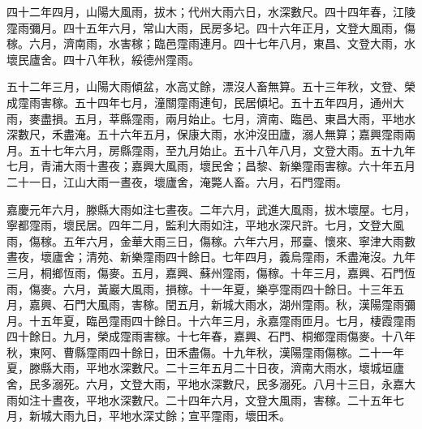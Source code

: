 \begin{pinyinscope}
四十二年四月，山陽大風雨，拔木；代州大雨六日，水深數尺。四十四年春，江陵霪雨彌月。四十五年六月，常山大雨，民房多圮。四十六年正月，文登大風雨，傷稼。六月，濟南雨，水害稼；臨邑霪雨連月。四十七年八月，東昌、文登大雨，水壞民廬舍。四十八年秋，綏德州霪雨。

五十二年三月，山陽大雨傾盆，水高丈餘，漂沒人畜無算。五十三年秋，文登、榮成霪雨害稼。五十四年七月，潼關霪雨連旬，民居傾圮。五十五年四月，通州大雨，麥盡損。五月，莘縣霪雨，兩月始止。七月，濟南、臨邑、東昌大雨，平地水深數尺，禾盡淹。五十六年五月，保康大雨，水沖沒田廬，溺人無算；嘉興霪雨兩月。五十七年六月，房縣霪雨，至九月始止。五十八年八月，文登大雨。五十九年七月，青浦大雨十晝夜；嘉興大風雨，壞民舍；昌黎、新樂霪雨害稼。六十年五月二十一日，江山大雨一晝夜，壞廬舍，淹斃人畜。六月，石門霪雨。

嘉慶元年六月，滕縣大雨如注七晝夜。二年六月，武進大風雨，拔木壞屋。七月，寧都霪雨，壞民居。四年二月，監利大雨如注，平地水深尺許。七月，文登大風雨，傷稼。五年六月，金華大雨三日，傷稼。六年六月，邢臺、懷來、寧津大雨數晝夜，壞廬舍；清苑、新樂霪雨四十餘日。七年四月，義烏霪雨，禾盡淹沒。九年三月，桐鄉恆雨，傷麥。五月，嘉興、蘇州霪雨，傷稼。十年三月，嘉興、石門恆雨，傷麥。六月，黃巖大風雨，損稼。十一年夏，樂亭霪雨四十餘日。十三年五月，嘉興、石門大風雨，害稼。閏五月，新城大雨水，湖州霪雨。秋，漢陽霪雨彌月。十五年夏，臨邑霪雨四十餘日。十六年三月，永嘉霪雨匝月。七月，棲霞霪雨四十餘日。九月，榮成霪雨害稼。十七年春，嘉興、石門、桐鄉霪雨傷麥。十八年秋，東阿、曹縣霪雨四十餘日，田禾盡傷。十九年秋，漢陽霪雨傷稼。二十一年夏，滕縣大雨，平地水深數尺。二十三年五月二十日夜，濟南大雨水，壞城垣廬舍，民多溺死。六月，文登大雨，平地水深數尺，民多溺死。八月十三日，永嘉大雨如注十晝夜，平地水深數尺。二十四年六月，文登大風雨，害稼。二十五年七月，新城大雨九日，平地水深丈餘；宣平霪雨，壞田禾。


\end{pinyinscope}
